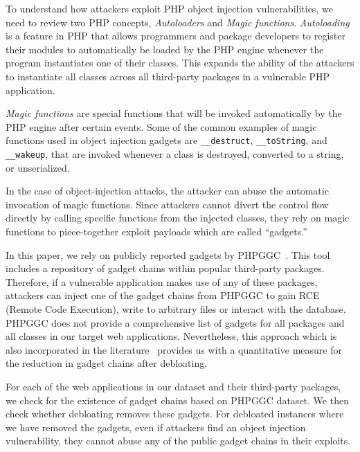 To understand how attackers exploit PHP object injection vulnerabilities, we need to review two PHP concepts, \emph{Autoloaders} and \emph{Magic functions}. 
\emph{Autoloading} is a feature in PHP that allows programmers and package developers to register their modules to automatically be loaded by the PHP engine whenever the program instantiates one of their classes. 
This expands the ability of the attackers to instantiate all classes across all third-party packages in a vulnerable PHP application. 

\emph{Magic functions} are special functions that will be invoked automatically by the PHP engine after certain events. 
Some of the common examples of magic functions used in object injection gadgets are \texttt{\_\_destruct}, \texttt{\_\_toString}, and \texttt{\_\_wakeup}, that are invoked whenever a class is destroyed, converted to a string, or unserialized. 

In the case of object-injection attacks, the attacker can abuse the automatic invocation of magic functions. Since attackers cannot divert the control flow directly by calling specific functions from the injected classes, they rely on magic functions to piece-together exploit payloads which are called ``gadgets.'' 


In this paper, we rely on publicly reported gadgets by PHPGGC~\cite{PHPGGC}. 
This tool includes a repository of gadget chains within popular third-party packages. 
Therefore, if a vulnerable application makes use of any of these packages, attackers can inject one of the gadget chains from PHPGGC to gain RCE (Remote Code Execution), write to arbitrary files or interact with the database. 
PHPGGC does not provide a comprehensive list of gadgets for all packages and all classes in our target web applications. 
Nevertheless, this approach which is also incorporated in the literature~\cite{lessismore} provides us with a quantitative measure for the reduction in gadget chains after debloating. 

For each of the web applications in our dataset and their third-party packages, we check for the existence of gadget chains based on PHPGGC dataset. 
We then check whether debloating removes these gadgets. 
For debloated instances where we have removed the gadgets, even if attackers find an object injection vulnerability, they cannot abuse any of the public gadget chains in their exploits. 
